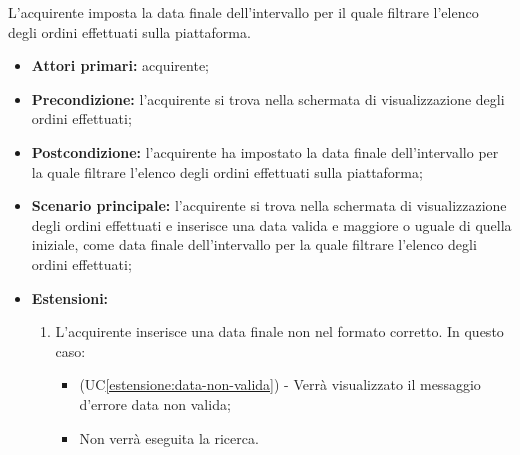 L'acquirente imposta la data finale dell'intervallo per il quale filtrare l'elenco degli ordini effettuati sulla piattaforma.
\begin{itemize}
    \item \textbf{Attori primari:} acquirente;
    \item \textbf{Precondizione:} l'acquirente si trova nella schermata di visualizzazione degli ordini effettuati;
    \item \textbf{Postcondizione:} l'acquirente ha impostato la data finale dell'intervallo per la quale filtrare l'elenco degli ordini effettuati sulla piattaforma;
    \item \textbf{Scenario principale:} l'acquirente si trova nella schermata di visualizzazione degli ordini effettuati e inserisce una data valida e maggiore o uguale di quella iniziale, come data finale dell'intervallo per la quale filtrare l'elenco degli ordini effettuati;
    \item \textbf{Estensioni:}
    \begin{enumerate}[label=\lett]
        \item L'acquirente inserisce una data finale non nel formato corretto. In questo caso:
        \begin{itemize}
            \item (UC\ref{estensione:data-non-valida}) - Verrà visualizzato il messaggio d'errore data non valida;
            \item Non verrà eseguita la ricerca.
        \end{itemize} 
    \end{enumerate}
\end{itemize}